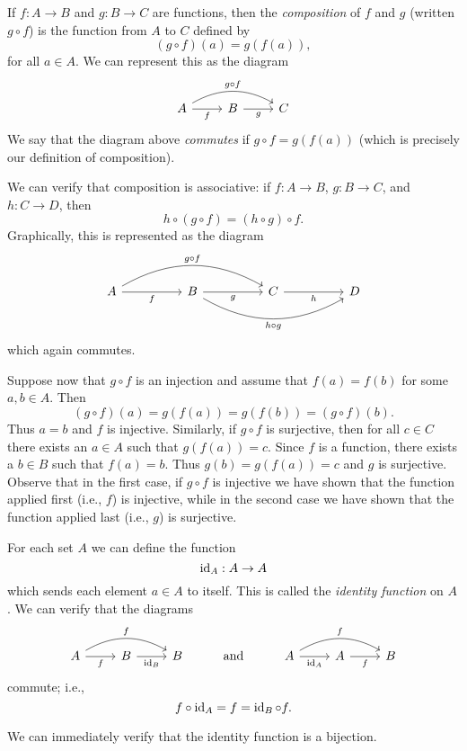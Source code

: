 \begin{sectionthm}
    If \(f: A \to B\) and \(g: B \to C\) are functions, then the
    \emph{composition} of \(f\) and \(g\) (written \(g \circ f\)) is the
    function from \(A\) to \(C\) defined by
    \[
        (g \circ f)(a) = g(f(a)),
    \]
    for all \(a \in A\). We can represent this as the diagram
    \[
        \begin{tikzcd}
            A \arrow[r, "f"'] \arrow[rr, "g \circ f", bend left] & B \arrow[r, "g"'] & C
        \end{tikzcd}
    \]
    We say that the diagram above \emph{commutes} if \(g \circ f = g(f(a))\)
    (which is precisely our definition of composition).

    We can verify that composition is associative: if \(f: A \to B\), \(g: B \to
    C\), and \(h: C \to D\), then
    \[
        h \circ (g \circ f) = (h \circ g) \circ f.
    \]
    Graphically, this is represented as the diagram
    \[
        \begin{tikzcd}
            A \arrow[rr, "f"'] \arrow[rrrr, "g \circ f", bend left] &  & B \arrow[rr, "g"'] \arrow[swap, rrrr, "h \circ g", bend right] &  & C \arrow[rr, "h"'] &  & D
        \end{tikzcd}
    \]
    which again commutes.

    Suppose now that \(g \circ f\) is an injection and assume that \(f(a) =
    f(b)\) for some \(a, b \in A\). Then
    \[
        (g \circ f)(a) = g(f(a)) = g(f(b)) = (g \circ f)(b).
    \]
    Thus \(a = b\) and \(f\) is injective. Similarly, if \(g \circ f\) is
    surjective, then for all \(c \in C\) there exists an \(a \in A\) such that
    \(g(f(a)) = c\). Since \(f\) is a function, there exists a \(b \in B\) such
    that \(f(a) = b\). Thus \(g(b) = g(f(a)) = c\) and \(g\) is surjective.
    Observe that in the first case, if \(g \circ f\) is injective we have shown
    that the function applied first (i.e., \(f\)) is injective, while in the
    second case we have shown that the function applied last (i.e., \(g\)) is
    surjective.
\end{sectionthm}

\begin{sectionthm}
    For each set \(A\) we can define the function
    \[
        \operatorname{id}_A: A \to A
    \]
    which sends each element \(a \in A\) to itself. This is called the
    \emph{identity function} on \(A\). We can verify that the diagrams
    \[
        \begin{tikzcd}
            A \arrow[r, "f"'] \arrow[rr, "f", bend left] & B \arrow[r, "\id_B"'] & B & \text{and}& A \arrow[r, "\id_A"'] \arrow[rr, "f", bend left] & A \arrow[r, "f"'] & B
        \end{tikzcd}
    \]
    commute; i.e.,
    \[
        f \circ \operatorname{id}_A = f = \operatorname{id}_B \circ f.
    \]

    We can immediately verify that the identity function is a bijection.
\end{sectionthm}

